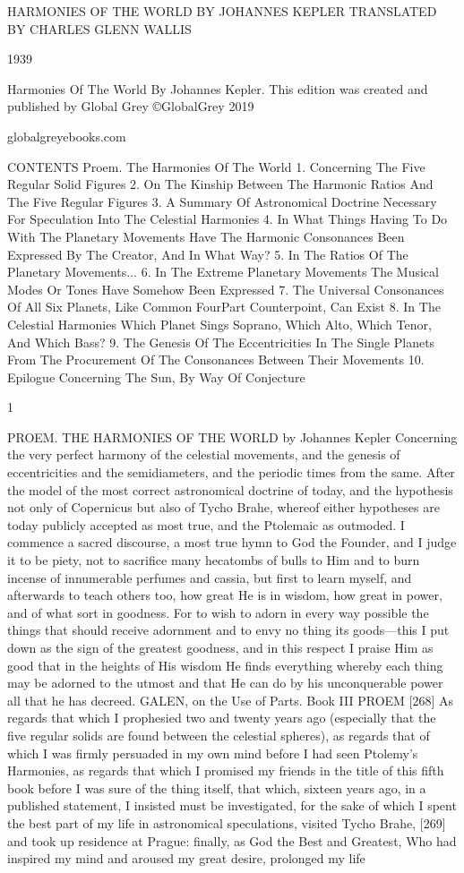 \documentclass{article}
\begin{document}
HARMONIES OF THE
WORLD
BY
JOHANNES KEPLER
TRANSLATED BY CHARLES GLENN WALLIS

1939


Harmonies Of The World By Johannes Kepler.
This edition was created and published by Global Grey
©GlobalGrey 2019

globalgreyebooks.com


CONTENTS
Proem. The Harmonies Of The World
1. Concerning The Five Regular Solid Figures
2. On The Kinship Between The Harmonic Ratios And The Five Regular
Figures
3. A Summary Of Astronomical Doctrine Necessary For Speculation Into
The Celestial Harmonies
4. In What Things Having To Do With The Planetary Movements Have
The Harmonic Consonances Been Expressed By The Creator, And In
What Way?
5. In The Ratios Of The Planetary Movements...
6. In The Extreme Planetary Movements The Musical Modes Or Tones
Have Somehow Been Expressed
7. The Universal Consonances Of All Six Planets, Like Common FourPart Counterpoint, Can Exist
8. In The Celestial Harmonies Which Planet Sings Soprano, Which Alto,
Which Tenor, And Which Bass?
9. The Genesis Of The Eccentricities In The Single Planets From The
Procurement Of The Consonances Between Their Movements
10. Epilogue Concerning The Sun, By Way Of Conjecture


1

PROEM. THE HARMONIES OF THE WORLD
by Johannes Kepler
Concerning the very perfect harmony of the celestial movements, and
the genesis of eccentricities and the semidiameters, and the periodic
times from the same.
After the model of the most correct astronomical doctrine of today, and
the hypothesis not only of Copernicus but also of Tycho Brahe, whereof
either hypotheses are today publicly accepted as most true, and the
Ptolemaic as outmoded.
I commence a sacred discourse, a most true hymn to God the Founder,
and I judge it to be piety, not to sacrifice many hecatombs of bulls to
Him and to burn incense of innumerable perfumes and cassia, but first
to learn myself, and afterwards to teach others too, how great He is in
wisdom, how great in power, and of what sort in goodness. For to wish
to adorn in every way possible the things that should receive
adornment and to envy no thing its goods—this I put down as the sign
of the greatest goodness, and in this respect I praise Him as good that
in the heights of His wisdom He finds everything whereby each thing
may be adorned to the utmost and that He can do by his unconquerable
power all that he has decreed.
GALEN, on the Use of Parts. Book III
PROEM
[268] As regards that which I prophesied two and twenty years ago
(especially that the five regular solids are found between the celestial
spheres), as regards that of which I was firmly persuaded in my own
mind before I had seen Ptolemy's Harmonies, as regards that which I
promised my friends in the title of this fifth book before I was sure of the
thing itself, that which, sixteen years ago, in a published statement, I
insisted must be investigated, for the sake of which I spent the best part
of my life in astronomical speculations, visited Tycho Brahe, [269] and
took up residence at Prague: finally, as God the Best and Greatest, Who
had inspired my mind and aroused my great desire, prolonged my life
\end{document}
